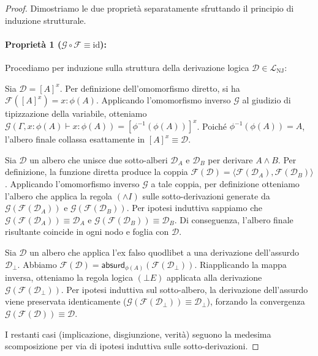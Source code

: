 \begin{proof}
    Dimostriamo le due proprietà separatamente sfruttando il principio di induzione strutturale.
    \paragraph{Proprietà 1 ($\mathcal{G} \circ \mathcal{F} \equiv \text{id}$):}
    Procediamo per induzione sulla struttura della derivazione logica $\mathcal{D} \in \mathcal{L}_{\text{NJ}}$:
    \begin{description}[leftmargin=1.5em, style=nextline, font=\bfseries]
        \item[Caso Assioma] 
            Sia $\mathcal{D} = [A]^x$. Per definizione dell'omomorfismo diretto, si ha $\mathcal{F}([A]^x) = x:{\phi(A)}$. Applicando l'omomorfismo inverso 
            $\mathcal{G}$ al giudizio di tipizzazione della variabile, otteniamo $\mathcal{G}(\Gamma, x:{\phi(A)} \vdash x:{\phi(A)}) = [\phi^{-1}(\phi(A))]^x$. 
            Poiché $\phi^{-1}(\phi(A)) = A$, l'albero finale collassa esattamente in $[A]^x \equiv \mathcal{D}$.
        \item[Caso Prodotto ($\land I$)] 
            Sia $\mathcal{D}$ un albero che unisce due sotto-alberi $\mathcal{D}_A$ e $\mathcal{D}_B$ per derivare $A \land B$. Per definizione, la funzione diretta produce la coppia 
            $\mathcal{F}(\mathcal{D}) = \langle \mathcal{F}(\mathcal{D}_A), \mathcal{F}(\mathcal{D}_B) \rangle$. Applicando l'omomorfismo inverso $\mathcal{G}$ a tale coppia, per definizione 
            otteniamo l'albero che applica la regola $(\land I)$ sulle sotto-derivazioni generate da $\mathcal{G}(\mathcal{F}(\mathcal{D}_A))$ e $\mathcal{G}(\mathcal{F}(\mathcal{D}_B))$. 
            Per ipotesi induttiva sappiamo che $\mathcal{G}(\mathcal{F}(\mathcal{D}_A)) \equiv \mathcal{D}_A$ e $\mathcal{G}(\mathcal{F}(\mathcal{D}_B)) \equiv \mathcal{D}_B$. Di conseguenza, 
            l'albero finale risultante coincide in ogni nodo e foglia con $\mathcal{D}$.
        \item[Caso Assurdo ($\bot E$)] 
            Sia $\mathcal{D}$ un albero che applica l'ex falso quodlibet a una derivazione dell'assurdo $\mathcal{D}_\bot$. Abbiamo $\mathcal{F}(\mathcal{D}) = \mathsf{absurd}_{\phi(A)}(\mathcal{F}(\mathcal{D}_\bot))$. 
            Riapplicando la mappa inversa, otteniamo la regola logica $(\bot E)$ applicata alla derivazione $\mathcal{G}(\mathcal{F}(\mathcal{D}_\bot))$. Per ipotesi induttiva sul sotto-albero, la derivazione dell'assurdo 
            viene preservata identicamente ($\mathcal{G}(\mathcal{F}(\mathcal{D}_\bot)) \equiv \mathcal{D}_\bot$), forzando la convergenza $\mathcal{G}(\mathcal{F}(\mathcal{D})) \equiv \mathcal{D}$.
    \end{description}
    I restanti casi (implicazione, disgiunzione, verità) seguono la medesima scomposizione per via di ipotesi induttiva sulle sotto-derivazioni.


\end{proof}

